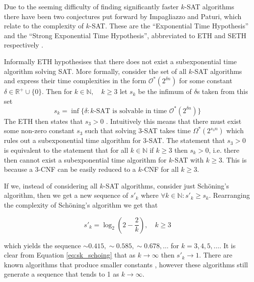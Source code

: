 Due to the seeming difficulty of finding significantly faster $k$-SAT algorithms
there have been two conjectures
put forward by Impagliazzo and Paturi, which
relate to the complexity of $k$-SAT. These are the ``Exponential Time Hypothesis'' and the ``Strong
Exponential Time Hypothesis'', abbreviated to ETH and SETH respectively \cite{impagliazzo2001complexity}.


Informally ETH hypothesises that there does not exist a subexponential time algorithm solving SAT.
More formally, consider the set of all $k$-SAT algorithms and
express their time complexities in the form $\mathcal{O}^{\ast}(2^{\delta n})$
for some constant $\delta \in \mathbb{R}^{+} \cup \{0\}$.
Then for $k \in \mathbb{N}, \quad k \geq 3$ let $s_k$ be the infimum
of $\delta$s taken from this set
\begin{equation} \label{eq:ETH}
    s_k = \inf \{\delta: \text{$k$-SAT is solvable in time } \mathcal{O}^{\ast}(2^{\delta n})\}
\end{equation}
The ETH then states that $s_{3} > 0$ \cite{impagliazzo2001complexity}.
Intuitively this means that there must exist some non-zero constant $s_{3}$ such
that solving 3-SAT takes time $\Omega^{\ast}(2^{s_{3} n})$ which rules out
a subexponential time algorithm for 3-SAT.
The statement that $s_3 > 0$ is equivalent to the statement that
for all $k \in \mathbb{N}$ if $k \geq 3$ then $s_k > 0$,
i.e. there then cannot exist a subexponential time
algorithm for $k$-SAT with $k \geq 3$. This is because a 3-CNF can be easily
reduced to a $k$-CNF for all $k \geq 3$.

If we, instead of considering all $k$-SAT algorithms, consider just Sch\"oning's
algorithm, then we get a new sequence of $s'_k$ where 
$\forall k \in \mathbb{N}: s'_k \geq s_k$. Rearranging the complexity
of Sch\"oning's algorithm we get that

\begin{equation} \label{eq:sk_schoing}
    s'_k = \log_2(2 - \frac{2}{k}), \quad k \geq 3
\end{equation}

which yields the sequence $\sim 0.415, \sim 0.585, \sim 0.678, \dots$ for
$k= 3,4,5, \dots$. It is clear from Equation \ref{eq:sk_schoing} that
as $k \to \infty$ then $s'_k \to 1$.
There are known algorithms that produce smaller constants \cite{hofmeister2002probabilistic},
however these algorithms still generate a sequence that tends to 1 as
$k \to \infty$.


